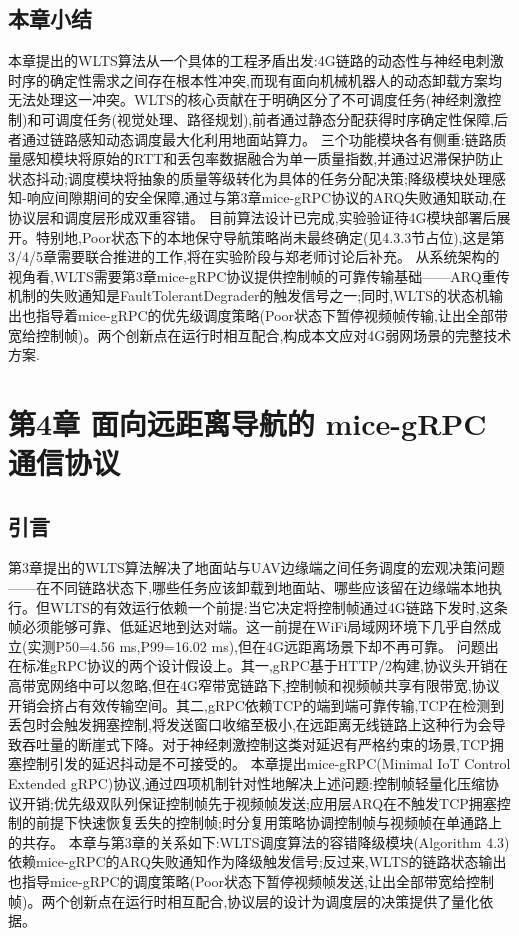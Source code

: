 \section{本章小结}
本章提出的WLTS算法从一个具体的工程矛盾出发:4G链路的动态性与神经电刺激时序的确定性需求之间存在根本性冲突,而现有面向机械机器人的动态卸载方案均无法处理这一冲突。WLTS的核心贡献在于明确区分了不可调度任务(神经刺激控制)和可调度任务(视觉处理、路径规划),前者通过静态分配获得时序确定性保障,后者通过链路感知动态调度最大化利用地面站算力。
三个功能模块各有侧重:链路质量感知模块将原始的RTT和丢包率数据融合为单一质量指数,并通过迟滞保护防止状态抖动;调度模块将抽象的质量等级转化为具体的任务分配决策;降级模块处理感知-响应间隙期间的安全保障,通过与第3章mice-gRPC协议的ARQ失败通知联动,在协议层和调度层形成双重容错。
目前算法设计已完成,实验验证待4G模块部署后展开。特别地,Poor状态下的本地保守导航策略尚未最终确定(见4.3.3节占位),这是第3/4/5章需要联合推进的工作,将在实验阶段与郑老师讨论后补充。
从系统架构的视角看,WLTS需要第3章mice-gRPC协议提供控制帧的可靠传输基础——ARQ重传机制的失败通知是FaultTolerantDegrader的触发信号之一;同时,WLTS的状态机输出也指导着mice-gRPC的优先级调度策略(Poor状态下暂停视频帧传输,让出全部带宽给控制帧)。两个创新点在运行时相互配合,构成本文应对4G弱网场景的完整技术方案.


\chapter{第4章 面向远距离导航的 mice-gRPC 通信协议}

\section{引言}
第3章提出的WLTS算法解决了地面站与UAV边缘端之间任务调度的宏观决策问题——在不同链路状态下,哪些任务应该卸载到地面站、哪些应该留在边缘端本地执行。但WLTS的有效运行依赖一个前提:当它决定将控制帧通过4G链路下发时,这条帧必须能够可靠、低延迟地到达对端。这一前提在WiFi局域网环境下几乎自然成立(实测P50=4.56 ms,P99=16.02 ms),但在4G远距离场景下却不再可靠。
问题出在标准gRPC协议的两个设计假设上。其一,gRPC基于HTTP/2构建,协议头开销在高带宽网络中可以忽略,但在4G窄带宽链路下,控制帧和视频帧共享有限带宽,协议开销会挤占有效传输空间。其二,gRPC依赖TCP的端到端可靠传输,TCP在检测到丢包时会触发拥塞控制,将发送窗口收缩至极小,在远距离无线链路上这种行为会导致吞吐量的断崖式下降。对于神经刺激控制这类对延迟有严格约束的场景,TCP拥塞控制引发的延迟抖动是不可接受的。
本章提出mice-gRPC(Minimal IoT Control Extended gRPC)协议,通过四项机制针对性地解决上述问题:控制帧轻量化压缩协议开销;优先级双队列保证控制帧先于视频帧发送;应用层ARQ在不触发TCP拥塞控制的前提下快速恢复丢失的控制帧;时分复用策略协调控制帧与视频帧在单通路上的共存。
本章与第3章的关系如下:WLTS调度算法的容错降级模块(Algorithm 4.3)依赖mice-gRPC的ARQ失败通知作为降级触发信号;反过来,WLTS的链路状态输出也指导mice-gRPC的调度策略(Poor状态下暂停视频帧发送,让出全部带宽给控制帧)。两个创新点在运行时相互配合,协议层的设计为调度层的决策提供了量化依据。


